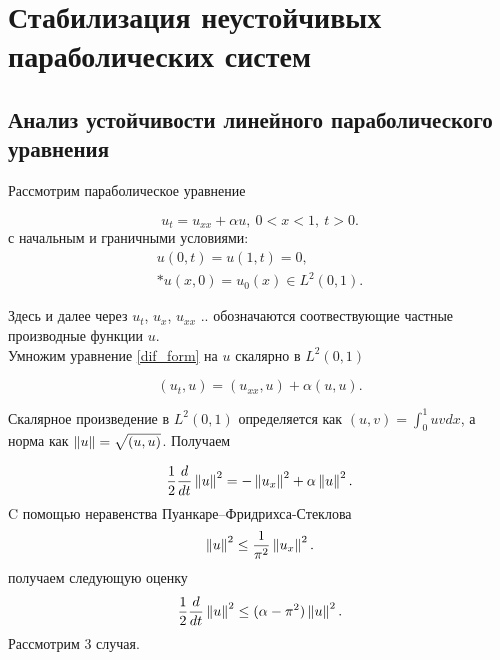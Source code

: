 \section{Стабилизация неустойчивых параболических систем}
\vspace{1em}

\subsection{Анализ устойчивости линейного параболического уравнения}

Рассмотрим параболическое уравнение

\begin{equation}\label{dif_form}
    u_t = u_{xx} + \alpha u, \ 0 < x < 1, \ t > 0.
\end{equation}
с начальным и граничными условиями:
\begin{gather}\label{d_control}
    u(0, t) = u(1, t) = 0, \\*
    u(x, 0) = u_{0}(x) \in L^2(0, 1). \nonumber
\end{gather}

Здесь и далее через $u_t$, $u_x$, $u_{xx}$ .. обозначаются соотвествующие
частные производные функции $u$.\\
Умножим уравнение \eqref{dif_form} на $u$ скалярно в $L^2(0, 1)$

\begin{equation*}
    (u_t, u) = (u_{xx}, u) + \alpha (u, u).
\end{equation*}

Скалярное произведение в $L^2(0, 1)$ определяется как $(u, v) = \int_0^1 uv dx$,
а норма как $\left\lVert u\right\rVert = \sqrt{(u, u)}$. Получаем

\begin{equation}\label{int_form}
    \frac{1}{2}\frac{d}{dt}\left\lVert u\right\rVert^2 = -\left\lVert u_x\right\rVert^2 + \alpha \left\lVert u\right\rVert^2.
\end{equation}
C помощью неравенства Пуанкаре–Фридрихса-Стеклова
\begin{equation*}
    \left\lVert u\right\rVert^2 \le \frac{1}{\pi^2} \left\lVert u_x\right\rVert^2.
\end{equation*}
получаем следующую оценку 
\begin{equation}\label{stable_opr}
    \frac{1}{2}\frac{d}{dt}\left\lVert u\right\rVert^2 \le (\alpha - \pi^2)\left\lVert u\right\rVert^2.
\end{equation}
Рассмотрим 3 случая.

